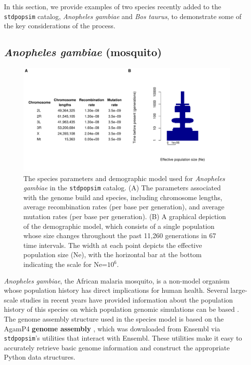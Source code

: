 \documentclass[hidelinks]{article}
\newcommand{\stdpopsim}{\texttt{stdpopsim}\xspace}
\begin{document}
In this section, we provide examples of two species recently added to the \stdpopsim catalog,
\textit{Anopheles gambiae} and \textit{Bos taurus},
to demonstrate some of the key considerations of the process.

\subsection*{\texorpdfstring{\emph{Anopheles gambiae} (mosquito)}{Anopheles gambiae (mosquito)}}
    \label{AnoGam}
    
\begin{figure}[b!]
	\includegraphics[width=\linewidth]{figs/anogam_demog_table}
	\caption{The species parameters and demographic model used for \emph{Anopheles gambiae} in the \stdpopsim catalog.
	(A) The parameters associated with the genome build and species, including
	chromosome lengths, average recombination rates (per base per generation),
	and average mutation rates (per base per generation).
	(B) A graphical depiction of the demographic model,
	which consists of a single population whose size changes throughout the past 11,260 generations in 67 time intervals. The width at each point depicts the effective population size (Ne), with the horizontal bar at the bottom indicating the scale for Ne=$10^6$.
		\label{fig:anogam} }
\end{figure}


\emph{Anopheles gambiae}, the African malaria mosquito, is 
a non-model organism whose population history has direct implications for human health.
Several large-scale studies in recent years have provided information about the
population history of this species on which population genomic simulations can be based \citep[e.g.,][]{Miles2017, clarkson2020genome}.
The genome assembly structure used in the species model is based 
on the AgamP4 \textbf{genome assembly} \citep{Sharakhova2007}, which 
was downloaded from Ensembl \citep{ensembl2021} via \stdpopsim's
utilities that interact with Ensembl. These utilities
make it easy to accurately retrieve basic genome information and construct the appropriate Python data structures.
\end{document}
